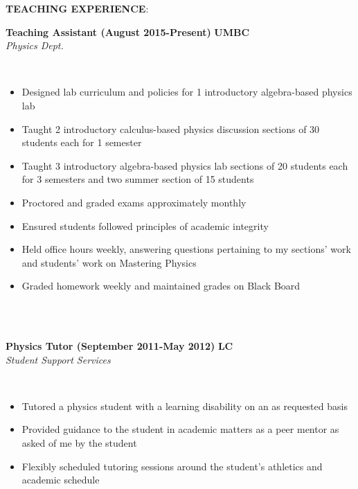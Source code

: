 \documentclass{article}
\begin{document}
\noindent \textbf{TEACHING EXPERIENCE}:\\
\begin{vwcol}[widths={0.8,0.2}, sep=.8cm, justify=flush, rule=0pt, indent=0em]
\noindent \textbf{Teaching Assistant (August 2015-Present)}
\newpage
\noindent \textbf{UMBC}\\
\noindent \emph{Physics Dept.}
\end{vwcol}
\phantom \\
\begin{itemize}
\item Designed lab curriculum and policies for 1 introductory algebra-based physics lab
\item Taught 2 introductory calculus-based physics discussion sections of 30 students each for 1 semester
\item Taught 3 introductory algebra-based physics lab sections of 20 students each for 3 semesters and two summer section of 15 students
\item Proctored and graded exams approximately monthly
\item Ensured students followed principles of academic integrity
\item Held office hours weekly, answering questions pertaining to my sections’ work and students’ work on Mastering Physics
\item Graded homework weekly and maintained grades on Black Board
\end{itemize}
\phantom \\
\phantom \\
%
%
%
%
\begin{vwcol}[widths={0.8,0.2}, sep=.8cm, justify=flush, rule=0pt, indent=0em]
\noindent \textbf{Physics Tutor (September 2011-May 2012)}
\newpage
\noindent \textbf{LC}\\
\noindent \emph{Student Support Services}
\end{vwcol}
\phantom \\
\begin{itemize}
\item Tutored a physics student with a learning disability on an as requested basis
\item Provided guidance to the student in academic matters as a peer mentor as asked of me by the student
\item Flexibly scheduled tutoring sessions around the student’s athletics and academic schedule
\end{itemize}
\phantom \\
\phantom \\
\end{document}
